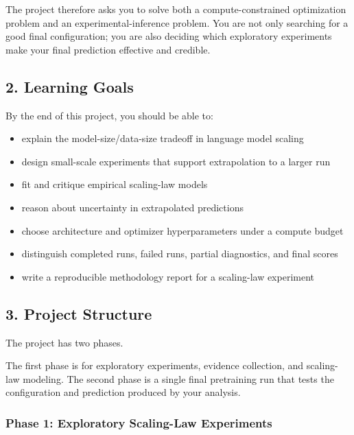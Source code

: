\documentclass[
  11pt,
]{article}
\providecommand{\tightlist}{%
  \setlength{\itemsep}{0pt}\setlength{\parskip}{0pt}}
\begin{document}
The project therefore asks you to solve both a compute-constrained
optimization problem and an experimental-inference problem. You are not
only searching for a good final configuration; you are also deciding
which exploratory experiments make your final prediction effective and
credible.

\hypertarget{learning-goals}{%
\subsection{2. Learning Goals}\label{learning-goals}}

By the end of this project, you should be able to:

\begin{itemize}
\tightlist
\item
  explain the model-size/data-size tradeoff in language model scaling
\item
  design small-scale experiments that support extrapolation to a larger
  run
\item
  fit and critique empirical scaling-law models
\item
  reason about uncertainty in extrapolated predictions
\item
  choose architecture and optimizer hyperparameters under a compute
  budget
\item
  distinguish completed runs, failed runs, partial diagnostics, and
  final scores
\item
  write a reproducible methodology report for a scaling-law experiment
\end{itemize}

\hypertarget{project-structure}{%
\subsection{3. Project Structure}\label{project-structure}}

The project has two phases.

The first phase is for exploratory experiments, evidence collection, and
scaling-law modeling. The second phase is a single final pretraining run
that tests the configuration and prediction produced by your analysis.

\hypertarget{phase-1-exploratory-scaling-law-experiments}{%
\subsubsection{Phase 1: Exploratory Scaling-Law
Experiments}\label{phase-1-exploratory-scaling-law-experiments}}
\end{document}
